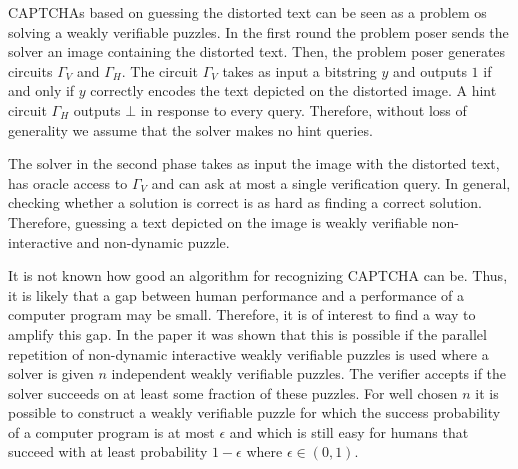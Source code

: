 CAPTCHAs based on guessing the distorted text can be seen as a problem os solving a weakly verifiable puzzles.
In the first round the problem poser sends the solver an image containing the distorted text.
Then, the problem poser generates circuits $\Gamma_V$ and $\Gamma_H$.
The circuit $\Gamma_V$ takes as input a bitstring $y$ and outputs $1$
if and only if $y$ correctly encodes the text depicted on the distorted image.
A hint circuit $\Gamma_H$ outputs $\bot$ in response to every query.
Therefore, without loss of generality we assume that the solver makes no hint queries.

The solver in the second phase takes as input the image with the distorted text, has oracle access to $\Gamma_V$
and can ask at most a single verification query. In general, checking whether a solution is correct is
as hard as finding a correct solution.
Therefore, guessing a text depicted on the image is weakly verifiable non-interactive and non-dynamic puzzle.

It is not known how good an algorithm for recognizing CAPTCHA can be. Thus, it is likely that a gap between human
performance and a performance of a computer program may be small. Therefore, it is of interest to find a way to amplify this gap.
In the paper \cite{DBLP:journals/corr/abs-1002-3534} it was shown that this is possible if the parallel repetition of non-dynamic
interactive weakly verifiable puzzles is used where a solver is given $n$ independent weakly verifiable puzzles.
The verifier accepts if the solver succeeds on at least some fraction of these puzzles.
For well chosen $n$ it is possible to construct a weakly verifiable puzzle for which the success probability of a computer program is at most $\epsilon$ and
which is still easy for humans that succeed with at least probability $1 - \epsilon$ where $\epsilon \in (0,1)$.

